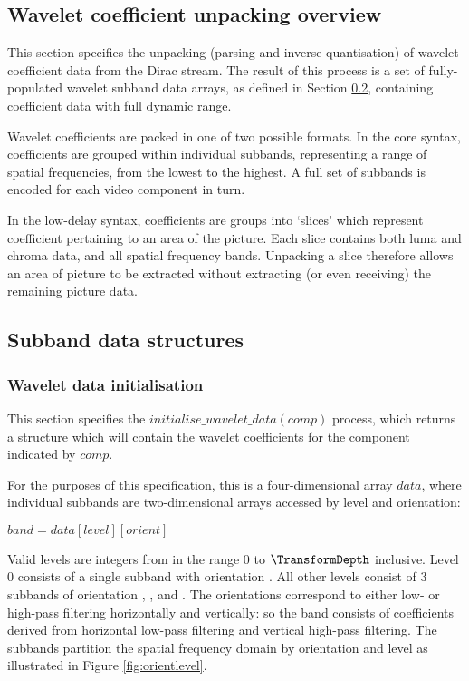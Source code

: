 \subsection{Wavelet coefficient unpacking overview}
\label{unapckingoverview}

This section specifies the unpacking (parsing and inverse
quantisation) of wavelet coefficient data
from the Dirac stream. The result of this process is a set
of fully-populated wavelet subband data arrays, as defined in
Section \ref{wltdecodeconventions}, containing coefficient
data with full dynamic range.

Wavelet coefficients are packed in one of two possible formats.
In the core syntax, coefficients are grouped within individual
subbands, representing a range of spatial frequencies, from the
lowest to the highest. A full set of subbands is encoded for each
video component in turn. 

In the low-delay syntax, coefficients
are groups into `slices' which represent coefficient pertaining
to an area of the picture. Each slice contains both luma and chroma
data, and all spatial frequency bands. Unpacking a slice therefore
allows an area of picture to be extracted without extracting (or even
receiving) the remaining picture data.

\subsection{Subband data structures}
\label{wltdecodeconventions}

\subsubsection{Wavelet data initialisation}

\label{wltinit}

This section specifies the $initialise\_wavelet\_data(comp)$ process, which returns a structure which will
contain the wavelet coefficients for the component indicated by $comp$. 

For the purposes of this specification, this is a four-dimensional array $data$,
where individual subbands are two-dimensional arrays accessed by level and orientation:

$band = data[level][orient]$

Valid levels are integers from in the range 0 to $\TransformDepth$ inclusive. 
Level 0 consists of a single subband with orientation \LL. 
All other levels consist of 3 subbands of orientation \LH, \HL, 
and \HH. The orientations correspond to either low- or high-pass filtering
horizontally and vertically: so the \LH band consists of coefficients derived
from horizontal low-pass filtering and vertical high-pass filtering. The subbands
partition the spatial frequency domain by orientation and level as illustrated
in Figure \ref{fig:orientlevel}.

